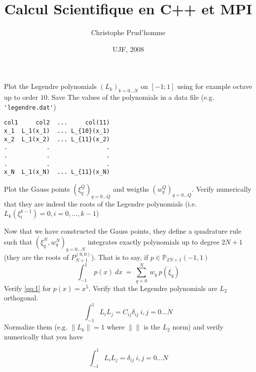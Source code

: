 \documentclass{article}
\title{Calcul Scientifique en C++ et MPI}
\author{Christophe Prud'homme}
\date{UJF, 2008}
\begin{document}
\maketitle



\begin{Exercise}[title={p type Galerkin method in 1D}]

  \Question Plot the Legendre polynomials $(L_k)_{k=0...N}$ on
  $[-1;1]$ using for example octave up to order $10$. Save The values
  of the polynomials in a data file (e.g. \verb+'legendre.dat'+)
\begin{verbatim}
col1     col2  ...     col(11)
x_1  L_1(x_1)  ... L_{10}(x_1)
x_2  L_1(x_2)  ... L_{11}(x_2)
.           .                .
.           .                .
.           .                .
x_N  L_1(x_N)  ... L_{11}(x_N)
\end{verbatim}

  \Question Plot the Gauss points $(\xi^Q_q)_{q=0...Q}$ and weigths
  $(w^Q_q)_{q=0...Q}$. Verify numerically that they are indeed the roots
  of the Legendre polynomials (i.e. $L_k(\xi^{k-1}_i) = 0, i = 0,...,k-1$)

  \Question Now that we have constructed the Gauss points, they define
  a quadrature rule such that $(\xi^N_q,w^N_q)_{q=0...N}$ integrates
  exactly polynomials up to degree $2N+1$ (they are the roots of
  $P^(0,0)_{N+1}$). That is to say, if $p \in \mathbb{P}_{2N+1}(-1,1)$
  \begin{equation}
    \label{eq:1}
    \int_{-1}^1\ p(x)\ dx\ =\ \sum_{q=0}^{N}\ w_q\ p( \xi_q )
  \end{equation}
  \subQuestion Verify \eqref{eq:1} for $p(x)=x^5$.
  \subQuestion Verify that the Legendre polynomials are $L_2$ orthogonal.
  \begin{equation}
    \label{eq:3}
    \int_{-1}^1 L_i L_j = C_{ij} \delta_{ij}\ i,j=0...N
  \end{equation}
  \subQuestion Normalize them (e.g. $\|L_k\| = 1$ where $\|\|$ is the
  $L_2$ norm) and verify numerically that you have

  \begin{equation}
    \label{eq:2}
    \int_{-1}^1 L_i L_j =  \delta_{ij}\ i,j=0...N
  \end{equation}


\end{Exercise}
\end{document}
